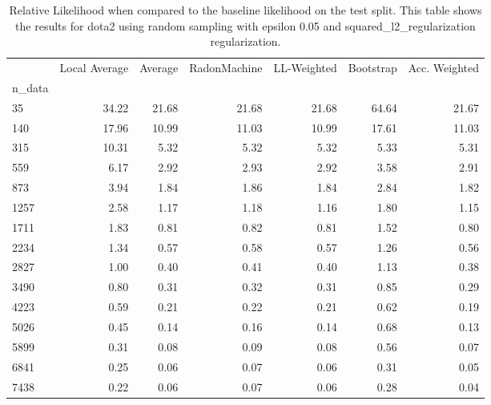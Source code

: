 \begin{table}
\centering
\caption{Relative Likelihood when compared to the baseline likelihood on the test split. This table shows the results for  dota2 using  random sampling with epsilon  0.05 and  squared_l2_regularization regularization.}
\label{tab:15}
\begin{tabular}{lrrrrrr}
\toprule
{} &  Local Average &  Average &  RadonMachine &  LL-Weighted &  Bootstrap &  Acc. Weighted \\
n\_data &                &          &               &              &            &                \\
\midrule
35     &          34.22 &    21.68 &         21.68 &        21.68 &      64.64 &          21.67 \\
140    &          17.96 &    10.99 &         11.03 &        10.99 &      17.61 &          11.03 \\
315    &          10.31 &     5.32 &          5.32 &         5.32 &       5.33 &           5.31 \\
559    &           6.17 &     2.92 &          2.93 &         2.92 &       3.58 &           2.91 \\
873    &           3.94 &     1.84 &          1.86 &         1.84 &       2.84 &           1.82 \\
1257   &           2.58 &     1.17 &          1.18 &         1.16 &       1.80 &           1.15 \\
1711   &           1.83 &     0.81 &          0.82 &         0.81 &       1.52 &           0.80 \\
2234   &           1.34 &     0.57 &          0.58 &         0.57 &       1.26 &           0.56 \\
2827   &           1.00 &     0.40 &          0.41 &         0.40 &       1.13 &           0.38 \\
3490   &           0.80 &     0.31 &          0.32 &         0.31 &       0.85 &           0.29 \\
4223   &           0.59 &     0.21 &          0.22 &         0.21 &       0.62 &           0.19 \\
5026   &           0.45 &     0.14 &          0.16 &         0.14 &       0.68 &           0.13 \\
5899   &           0.31 &     0.08 &          0.09 &         0.08 &       0.56 &           0.07 \\
6841   &           0.25 &     0.06 &          0.07 &         0.06 &       0.31 &           0.05 \\
7438   &           0.22 &     0.06 &          0.07 &         0.06 &       0.28 &           0.04 \\
\bottomrule
\end{tabular}
\end{table}
